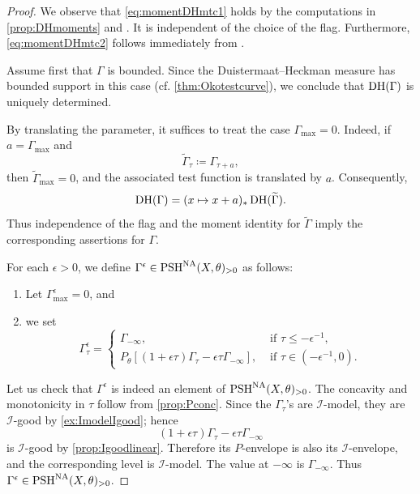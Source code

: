 \begin{proof}
We observe that \eqref{eq:momentDHmtc1} holds by the computations in \cref{prop:DHmoments} and . It is independent of the choice of the flag. Furthermore, \eqref{eq:momentDHmtc2} follows immediately from .


Assume first that $\Gamma$ is bounded.
Since the Duistermaat--Heckman measure has bounded support in this case (cf. \cref{thm:Okotestcurve}), we conclude that $\operatorname{DH}(\Gamma)$ is uniquely determined.

By translating the parameter, it suffices to treat the case $\Gamma_{\max}=0$. Indeed, if $a=\Gamma_{\max}$ and
\[
    \widetilde\Gamma_\tau\coloneqq\Gamma_{\tau+a},
\]
then $\widetilde\Gamma_{\max}=0$, and the associated test function is translated by $a$. Consequently,
\[
    \operatorname{DH}(\Gamma)=(x\mapsto x+a)_*\operatorname{DH}(\widetilde\Gamma).
\]
Thus independence of the flag and the moment identity for $\widetilde\Gamma$ imply the corresponding assertions for $\Gamma$.

For each $\epsilon>0$, we define $\Gamma^{\epsilon}\in \mathrm{PSH}^{\mathrm{NA}}(X,\theta)_{>0}$ as follows:
\begin{enumerate}
        \item\label{itm:chapter-NApotential:L761:1} Let $\Gamma^{\epsilon}_{\max}=0$, and
        \item\label{itm:chapter-NApotential:L761:2} we set
        \[
        \Gamma^{\epsilon}_{\tau}=
        \begin{cases}
            \Gamma_{-\infty},&\text{ if }\tau\leq -\epsilon^{-1},\\
            P_{\theta}\left[ (1+\epsilon\tau)\Gamma_{\tau}-\epsilon\tau \Gamma_{-\infty} \right],&\text{ if }\tau\in \left(-\epsilon^{-1},0\right).
        \end{cases}
        \]
    \end{enumerate}
Let us check that $\Gamma^\epsilon$ is indeed an element of $\mathrm{PSH}^{\mathrm{NA}}(X,\theta)_{>0}$. The concavity and monotonicity in $\tau$ follow from \cref{prop:Pconc}. Since the $\Gamma_\tau$'s are $\mathcal I$-model, they are $\mathcal I$-good by \cref{ex:ImodelIgood}; hence
\[
(1+\epsilon\tau)\Gamma_\tau-\epsilon\tau\Gamma_{-\infty}
\]
is $\mathcal I$-good by \cref{prop:Igoodlinear}. Therefore its $P$-envelope is also its $\mathcal I$-envelope, and the corresponding level is $\mathcal I$-model. The value at $-\infty$ is
$\Gamma_{-\infty}$. Thus $\Gamma^\epsilon\in\mathrm{PSH}^{\mathrm{NA}}(X,\theta)_{>0}$.



\end{proof}
